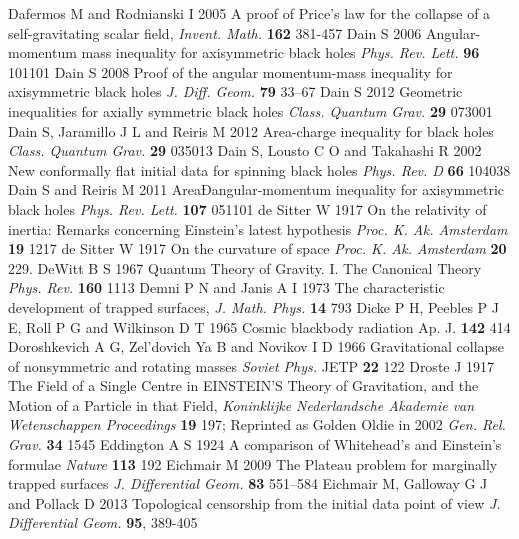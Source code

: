 \documentclass[12pt]{iopart}
\begin{document}
\begin{thebibliography}{999}
 Dafermos M and Rodnianski I 2005 A proof of Price's law for the collapse of a self-gravitating scalar field, {\it Invent. Math.} {\bf 162} 381-457
 Dain S 2006 Angular-momentum mass inequality for axisymmetric black holes {\it Phys. Rev. Lett.} {\bf 96} 101101
 Dain S 2008 Proof of the angular momentum-mass inequality for axisymmetric black holes {\it J. Diff. Geom.} {\bf 79} 33--67
 Dain S 2012 Geometric inequalities for axially symmetric black
holes {\it Class. Quantum Grav.} {\bf 29} 073001
 Dain S, Jaramillo J L and Reiris M 2012
Area-charge inequality for black holes {\it Class. Quantum Grav.} {\bf 29} 035013
 Dain S, Lousto C O and Takahashi R 2002 New conformally flat initial data for spinning black holes {\it Phys. Rev. D} {\bf 66} 104038
 Dain S and Reiris M 2011 AreaÐangular-momentum inequality for axisymmetric black holes {\it Phys. Rev. Lett.} {\bf 107} 051101
 de Sitter W 1917 On the relativity of inertia: Remarks concerning Einstein's latest hypothesis {\it Proc. K. Ak. Amsterdam} {\bf 19}  1217
 de Sitter W 1917 On the curvature of space {\it Proc. K. Ak. Amsterdam} {\bf 20} 229.
 DeWitt B S 1967 Quantum Theory of Gravity. I. The Canonical Theory {\it Phys. Rev.} {\bf 160} 1113
 Demni P N and Janis A I 1973 The characteristic development 
of trapped surfaces, {\it J. Math. Phys.} {\bf 14} 793
 Dicke P H, Peebles P J E, Roll P G and Wilkinson D T 1965 Cosmic blackbody radiation {Ap. J.} {\bf 142} 414
 Doroshkevich A G, Zel'dovich Ya B and Novikov I D 1966 Gravitational collapse of nonsymmetric and rotating masses {\it Soviet Phys.} JETP {\bf 22} 122
 Droste J 1917 The Field of a Single Centre in EINSTEIN'S
Theory of Gravitation, and the Motion of a Particle in that Field, {\it Koninklijke Nederlandsche Akademie van
Wetenschappen Proceedings} {\bf 19} 197; Reprinted as Golden Oldie in 2002  {\it Gen. Rel. Grav.} {\bf 34} 1545
 Eddington A S 1924 A comparison of Whitehead's and Einstein's formulae {\it Nature} {\bf 113} 192
 Eichmair M 2009 The Plateau problem for marginally trapped surfaces {\it J. Differential Geom.}
{\bf 83} 551--584
 Eichmair M, Galloway G J and Pollack D 2013 Topological censorship from the initial data point of view {\it J. Differential Geom.} {\bf 95},  389-405%

\end{thebibliography}
\end{document}
